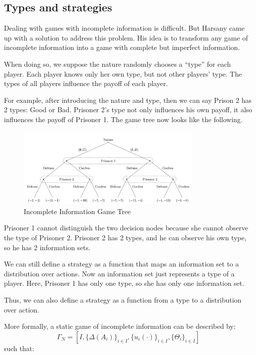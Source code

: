 \documentclass[12pt, oneside]{article}
\begin{document}
\subsection{Types and strategies}
Dealing with games with incomplete information is difficult. But Harsany came up with a solution to address this problem. His idea is to transform any game of incomplete information into a game with complete but imperfect information.

When doing so, we suppose the nature randomly chooses a “type” for each player. Each player knows only her own type, but not other players' type. The types of all players influence the payoff of each player.

For example, after introducing the nature and type, then we can say Prison 2 has 2 types: Good or Bad. Prisoner 2's type not only influences his own payoff, it also influences the payoff of Prisoner 1.
The game tree now looks like the following.
\begin{figure}[h!]
    \centering
    \includegraphics[width=0.8\textwidth]{Figure/incom_tree.png} 
    \caption{Incomplete Information Game Tree} 
    \label{fig:2} 
\end{figure}

\break
Prisoner 1 cannot distinguish the two decision nodes because she cannot observe the type of Prisoner 2.
Prisoner 2 has 2 types, and he can observe his own type, so he has 2 information sets.

We can still define a strategy as a function that maps an information set to a distribution over actions.
Now an information set just represents a type of a player. Here, Prisoner 1 has only one type, so she has only one information set.

Thus, we can also define a strategy as a function from a type to a distribution over action.

More formally, a static game of incomplete information can be described by:
\[
\Gamma_N = [I, \{\Delta(A_i)\}_{i \in I}, \{u_i(\cdot)\}_{i \in I}, \{\Theta_i\}_{i \in I}]
\]
such that:
\end{document}
